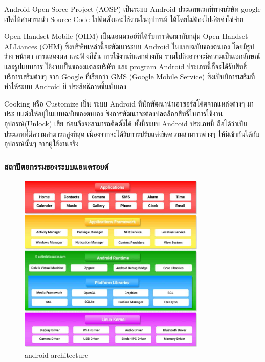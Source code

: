 Android Open Sorce Project (AOSP) เป็นระบบ Android ประเภทแรกที่ทางบริษัท google
เปิดให้สามารถนํา Source Code ไปติดตั้งและใช้งานในอุปกรณ์ ได้โดยไม่ต้องไปเสียค่าใช่จ่าย

Open Handset Mobile (OHM) เป็นแอนดรอย์ที่ได้รับการพัฒนากับกลุ่ม Open Handset ALLiances (OHM) ซึ่งบริษัทเหล่านี้จะพัฒนาระบบ Android ในแบบฉบับของตนเอง โดยมีรูปร่าง หน้าตา
การแสดงผล และฟั งกืชัน การใช้งานที่แตกต่างกัน รวมไปถึงอาจจะมีความเป็นเอกลักษณ์ และรูปแบบการ
ใช้งานเป็นของงแต่ละบริษัท และ program Android ประเภทนี้ก็จะได้รับสิทธิ์ บริการเสริมต่างๆ จาก
Google ที่เรียกว่า GMS (Google Mobile Service) ซึ่งเป็นบิการเสริมที่ ทําให้ระบบ Android มี
ประสิทธิภาพขึ้นนั้นเอง

Cooking หรือ Customize เป็น ระบบ Android ที่นักพัฒนานําเอาซอร์สโค้ตจากแหล่งต่างๆ มาประ
บแต่งให้อยุ่ในแบบฉบัยของตนเอง ซึ่งการพัฒนาจะต้องปลดล็อกสิทธิ์ในการใช้งานอุปกรณ์(Unlock) เสีย
ก่อนจึงจะสามารถติดตั้งได้ ทั้งนี้ระบบ Android ประเภทนี้ ถือได้ว่าเป็นประเภทที่มีความสามารถสูงที่สุด
เนื่องจากจะได้รับการปรับแต่งขีดความสามารถต่างๆ ให้มีเข้ากันได้กับอุปกรณ์นั้นๆ จากผู้ใช้งานจริง


\subsubsection{สถาปัตยกรรมของระบบแอนดรอยด์}
\begin{figure}[h]
  \begin{center}
    \includegraphics[width=0.8\textwidth]{./image/architecture.jpg}
  \end{center}
  \caption[Poem]{android architecture}
  \label{fig:walrus}
  \end{figure}

